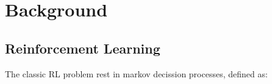 
\section{Background}
\label{sec:background}

\subsection{Reinforcement Learning}
\label{subsec:rl}

The classic RL problem rest in markov decission processes, defined as:



\endinput


